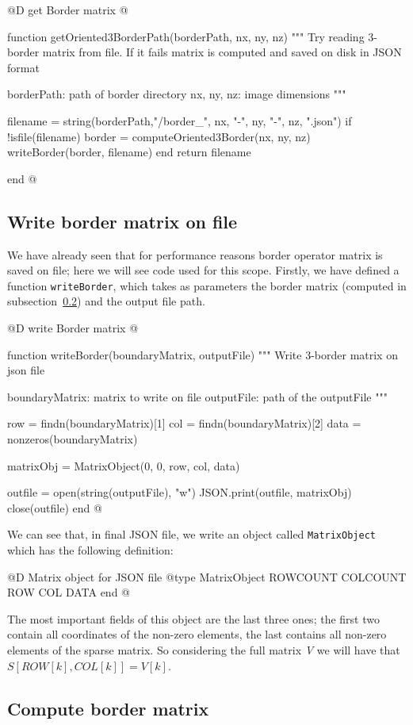 \documentclass[11pt,oneside]{article}	%
\begin{document}
@D get Border matrix
@{function getOriented3BorderPath(borderPath, nx, ny, nz)
  """
  Try reading 3-border matrix from file. If it fails matrix
  is computed and saved on disk in JSON format

  borderPath: path of border directory
  nx, ny, nz: image dimensions
  """

  filename = string(borderPath,"/border_", nx, "-", ny, "-", nz, ".json")
  if !isfile(filename)
    border = computeOriented3Border(nx, ny, nz)
    writeBorder(border, filename)
  end
  return filename

end @}

\subsection{Write border matrix on file}\label{sec:writeBorderMatrix}

We have already seen that for performance reasons border operator matrix is saved on file; here we will see code used for this scope. Firstly, we have defined a function \texttt{writeBorder}, which takes as parameters the border matrix (computed in subsection~\ref{sec:computeBorder}) and the output file path. 

@D write Border matrix
@{function writeBorder(boundaryMatrix, outputFile)
  """
  Write 3-border matrix on json file

  boundaryMatrix: matrix to write on file
  outputFile: path of the outputFile
  """

  row = findn(boundaryMatrix)[1]
  col = findn(boundaryMatrix)[2]
  data = nonzeros(boundaryMatrix)

  matrixObj = MatrixObject(0, 0, row, col, data)

  outfile = open(string(outputFile), "w")
  JSON.print(outfile, matrixObj)
  close(outfile)
end @}

We can see that, in final JSON file, we write an object called \texttt{MatrixObject} which has the following definition:

@D Matrix object for JSON file
@{type MatrixObject
  ROWCOUNT
  COLCOUNT
  ROW
  COL
  DATA
end @}

The most important fields of this object are the last three ones; the first two contain all coordinates of the non-zero elements, the last contains all non-zero elements of the sparse matrix. So considering the full matrix \textit{V} we will have that $S[ROW[k], COL[k]] = V[k]$.

\subsection{Compute border matrix}\label{sec:computeBorder}
\end{document}

